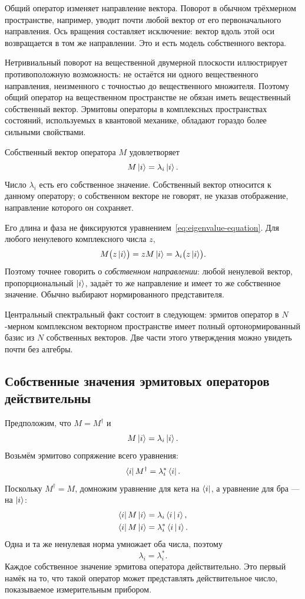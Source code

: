 Общий оператор изменяет направление вектора. Поворот в обычном трёхмерном пространстве, например, уводит почти любой вектор от его первоначального направления. Ось вращения составляет исключение: вектор вдоль этой оси возвращается в том же направлении. Это и есть модель собственного вектора.

Нетривиальный поворот на вещественной двумерной плоскости иллюстрирует противоположную возможность: не остаётся ни одного вещественного направления, неизменного с точностью до вещественного множителя. Поэтому общий оператор на вещественном пространстве не обязан иметь вещественный собственный вектор. Эрмитовы операторы в комплексных пространствах состояний, используемых в квантовой механике, обладают гораздо более сильными свойствами.

Собственный вектор оператора \(M\) удовлетворяет
\begin{equation}
M\left\lvert i\right\rangle=\lambda_i\left\lvert i\right\rangle.
\label{eq:eigenvalue-equation}
\end{equation}
Число \(\lambda_i\) есть его собственное значение. Собственный вектор относится к данному оператору; о собственном векторе не говорят, не указав отображение, направление которого он сохраняет.

Его длина и фаза не фиксируются уравнением~\eqref{eq:eigenvalue-equation}. Для любого ненулевого комплексного числа \(z\),
\[
M\bigl(z\left\lvert i\right\rangle\bigr)
=zM\left\lvert i\right\rangle
=\lambda_i\bigl(z\left\lvert i\right\rangle\bigr).
\]
Поэтому точнее говорить о \emph{собственном направлении}: любой ненулевой вектор, пропорциональный \(\left\lvert i\right\rangle\), задаёт то же направление и имеет то же собственное значение. Обычно выбирают нормированного представителя.

Центральный спектральный факт состоит в следующем: эрмитов оператор в \(N\)-мерном комплексном векторном пространстве имеет полный ортонормированный базис из \(N\) собственных векторов. Две части этого утверждения можно увидеть почти без алгебры.

\subsection{Собственные значения эрмитовых операторов действительны}

Предположим, что \(M=M^\dagger\) и
\[
M\left\lvert i\right\rangle=\lambda_i\left\lvert i\right\rangle.
\]
Возьмём эрмитово сопряжение всего уравнения:
\begin{equation}
\left\langle i\right\rvert M^\dagger=\lambda_i^*\left\langle i\right\rvert.
\label{eq:eigen-bra-equation}
\end{equation}
Поскольку \(M^\dagger=M\), домножим уравнение для кета на \(\left\langle i\right\rvert\), а уравнение для бра — на \(\left\lvert i\right\rangle\):
\begin{align}
\left\langle i\right\rvert M\left\lvert i\right\rangle&=\lambda_i\left\langle i\,\middle|\,i\right\rangle,\\
\left\langle i\right\rvert M\left\lvert i\right\rangle&=\lambda_i^*\left\langle i\,\middle|\,i\right\rangle.
\end{align}
Одна и та же ненулевая норма умножает оба числа, поэтому
\begin{equation}
\lambda_i=\lambda_i^*.
\end{equation}
Каждое собственное значение эрмитова оператора действительно. Это первый намёк на то, что такой оператор может представлять действительное число, показываемое измерительным прибором.

